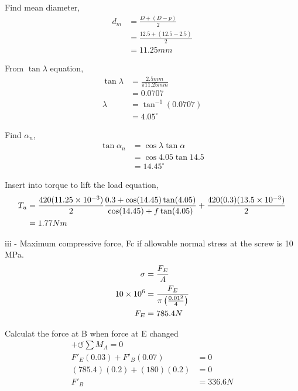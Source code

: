 \documentclass[a4paper, fleqn]{article}
\providecommand{\sci}[1]{\protect\ensuremath{\times 10^{\StrSubstitute[0]{#1}{e}{}}}}
\begin{document}
Find mean diameter,
\begin{equation*}
    \begin{aligned}
    d_m &= \frac {D+(D-p)}{2}\\  
    &= \frac {12.5+(12.5-2.5)}{2}\\ 
    &= 11.25mm
    \end{aligned}
\end{equation*}

From $\tan\lambda$ equation,
\begin{equation*}
    \begin{aligned}
    \tan\lambda &= \frac{2.5mm}{\pi 11.25mm} \\
    &=0.0707\\
    \lambda &= \tan^{-1}(0.0707)\\
    &=4.05^{\circ}
    \end{aligned}
\end{equation*}

Find $\alpha_n$,
\begin{equation*}
    \begin{aligned}
    \tan \alpha_n &= \cos \lambda \tan \alpha\\
     &= \cos 4.05 \tan 14.5\\
    &= 14.45^{\circ}
    \end{aligned} 
\end{equation*}

Insert into torque to lift the load equation,
\begin{equation*}
    \begin{aligned}
    T_u &= \frac{420(11.25\sci{e-3})}{2} \frac{0.3+\cos(14.45) \tan(4.05)}{\cos(14.45) + f\tan(4.05)} + \frac{420(0.3)(13.5\sci{e-3})}{2} \\
    &=1.77 Nm
    \end{aligned}
\end{equation*}

iii - Maximum compressive force, Fc if allowable normal stress at the screw is 10 MPa.
\begin{equation*}
    \begin{aligned}
    \sigma &= \frac{F_E}{A}\\
    10\sci{6}&=\frac{F_E}{\pi \left(\frac{0.01^2}{4}\right)}\\
    F_E &=785.4 N
    \end{aligned}
\end{equation*}

Calculat the force at B when force at E changed
\begin{equation*}
    \begin{aligned}
    +\circlearrowleft \sum M_A =0\\  
    F'_E(0.03)+F'_B(0.07) &=0\\ 
    (785.4)(0.2)+(180)(0.2) &=0\\ 
    F'_B &= 336.6 N
    \end{aligned}
\end{equation*}
\end{document}
